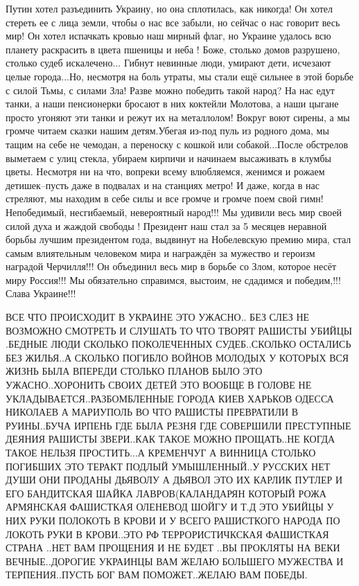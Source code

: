 Путин хотел разъединить Украину, но она сплотилась, как никогда! Он хотел
стереть ее с лица земли, чтобы о нас все забыли, но сейчас о нас говорит весь
мир! Он хотел испачкать кровью наш мирный флаг, но Украине удалось всю планету
раскрасить в цвета пшеницы и неба ! Боже, столько домов разрушено, столько
судеб искалечено... Гибнут невинные люди, умирают дети, исчезают целые
города...Но, несмотря на боль утраты, мы стали ещё сильнее в этой борьбе с
силой Тьмы, с силами Зла! Разве можно победить такой народ? На нас едут танки,
а наши пенсионерки бросают в них коктейли Молотова, а наши цыгане просто
угоняют эти танки и режут их на металлолом! Вокруг воют сирены, а мы громче
читаем сказки нашим детям.Убегая из-под пуль из родного дома, мы тащим на себе
не чемодан, а переноску с кошкой или собакой...После обстрелов выметаем с улиц
стекла, убираем кирпичи и начинаем высаживать в клумбы цветы. Несмотря ни на
что, вопреки всему влюбляемся, женимся и рожаем детишек--пусть даже в подвалах
и на станциях метро! И даже, когда в нас стреляют, мы находим в себе силы и все
громче и громче поем свой гимн! Непобедимый, несгибаемый, невероятный народ!!!
Мы удивили весь мир своей силой духа и жаждой свободы ! Президент наш стал за 5
месяцев неравной борьбы лучшим президентом года, выдвинут на Нобелевскую премию
мира, стал самым влиятельным человеком мира и награждён за мужество и героизм
наградой Черчилля!!! Он объединил весь мир в борьбе со Злом, которое несёт миру
Россия!!! Мы обязательно справимся, выстоим, не сдадимся и победим,!!!Слава
Украине!!!

ВСЕ ЧТО ПРОИСХОДИТ В УКРАИНЕ ЭТО УЖАСНО.. БЕЗ СЛЕЗ НЕ ВОЗМОЖНО СМОТРЕТЬ И
СЛУШАТЬ ТО ЧТО ТВОРЯТ РАШИСТЫ УБИЙЦЫ .БЕДНЫЕ ЛЮДИ СКОЛЬКО ПОКОЛЕЧЕННЫХ
СУДЕБ..СКОЛЬКО ОСТАЛИСЬ БЕЗ ЖИЛЬЯ..А СКОЛЬКО ПОГИБЛО ВОЙНОВ МОЛОДЫХ У КОТОРЫХ
ВСЯ ЖИЗНЬ БЫЛА ВПЕРЕДИ СТОЛЬКО ПЛАНОВ БЫЛО ЭТО УЖАСНО..ХОРОНИТЬ СВОИХ ДЕТЕЙ ЭТО
ВООБЩЕ В ГОЛОВЕ НЕ УКЛАДЫВАЕТСЯ..РАЗБОМБЛЕННЫЕ ГОРОДА КИЕВ ХАРЬКОВ ОДЕССА
НИКОЛАЕВ А МАРИУПОЛЬ ВО ЧТО РАШИСТЫ  ПРЕВРАТИЛИ В РУИНЫ..БУЧА ИРПЕНЬ ГДЕ БЫЛА
РЕЗНЯ ГДЕ СОВЕРШИЛИ ПРЕСТУПНЫЕ ДЕЯНИЯ РАШИСТЫ ЗВЕРИ..КАК ТАКОЕ МОЖНО
ПРОЩАТЬ..НЕ КОГДА ТАКОЕ НЕЛЬЗЯ ПРОСТИТЬ...А КРЕМЕНЧУГ А ВИННИЦА СТОЛЬКО
ПОГИБШИХ ЭТО ТЕРАКТ ПОДЛЫЙ УМЫШЛЕННЫЙ..У РУССКИХ НЕТ ДУШИ ОНИ ПРОДАНЫ ДЬЯВОЛУ А
ДЬЯВОЛ ЭТО ИХ КАРЛИК ПУТЛЕР И ЕГО БАНДИТСКАЯ ШАЙКА ЛАВРОВ(КАЛАНДАРЯН КОТОРЫЙ
РОЖА АРМЯНСКАЯ ФАШИСТКАЯ ОЛЕНЕВОД ШОЙГУ И Т.Д ЭТО УБИЙЦЫ У НИХ РУКИ ПОЛОКОТЬ В
КРОВИ И У ВСЕГО РАШИСТКОГО НАРОДА ПО ЛОКОТЬ РУКИ В КРОВИ..ЭТО РФ
ТЕРРОРИСТИЧКСКАЯ ФАШИСТКАЯ СТРАНА ..НЕТ ВАМ ПРОЩЕНИЯ И НЕ БУДЕТ ..ВЫ ПРОКЛЯТЫ
НА ВЕКИ ВЕЧНЫЕ..ДОРОГИЕ УКРАИНЦЫ ВАМ ЖЕЛАЮ БОЛЬШЕГО МУЖЕСТВА И ТЕРПЕНИЯ..ПУСТЬ
БОГ ВАМ ПОМОЖЕТ..ЖЕЛАЮ ВАМ ПОБЕДЫ.

